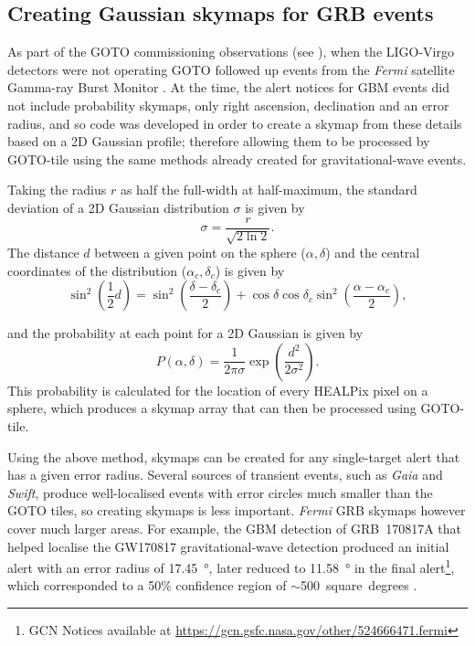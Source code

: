 \subsection{Creating Gaussian skymaps for GRB events}
\label{sec:grb_skymaps}
\begin{colsection}

As part of the GOTO commissioning observations (see ), when the LIGO-Virgo detectors were not operating GOTO followed up  events from the \textit{Fermi} satellite Gamma-ray Burst Monitor \citep[GBM;][]{Fermi_GBM}. At the time, the alert notices for GBM events did not include probability skymaps, only right ascension, declination and an error radius, and so code was developed in order to create a skymap from these details based on a 2D Gaussian profile; therefore allowing them to be processed by GOTO-tile using the same methods already created for gravitational-wave events.

Taking the radius $r$ as half the full-width at half-maximum, the standard deviation of a 2D Gaussian distribution $\sigma$ is given by
%
\begin{equation}
    \sigma = \frac{r}{\sqrt{2 \ln 2}}.
    \label{eq:gaussian_sigma}
\end{equation}
%
The distance $d$ between a given point on the sphere ($\alpha, \delta$) and the central coordinates of the distribution ($\alpha_c, \delta_c$) is given by
%
\begin{equation}
    \sin^2 \left ( \frac{1}{2} d \right )
    = \sin^2 \left ( \frac{\delta-\delta_c}{2} \right)
      + \cos \delta \cos \delta_c \sin^2 \left ( \frac{\alpha-\alpha_c}{2} \right),
    \label{eq:gaussian_distance}
\end{equation}

\noindent and the probability at each point for a 2D Gaussian is given by
%
\begin{equation}
    P(\alpha, \delta) = \frac{1}{2\pi\sigma} \exp \left ( \frac{d^2}{2\sigma^2} \right ).
    \label{eq:gaussian_prob}
\end{equation}
%
This probability is calculated for the location of every HEALPix pixel on a sphere, which produces a skymap array that can then be processed using GOTO-tile.

Using the above method, skymaps can be created for any single-target alert that has a given error radius. Several sources of transient events, such as \textit{Gaia} and \textit{Swift}, produce well-localised events with error circles much smaller than the GOTO tiles, so creating skymaps is less important. \textit{Fermi} GRB skymaps however cover much larger areas. For example, the GBM detection of GRB~170817A that helped localise the GW170817 gravitational-wave detection produced an initial alert with an error radius of \SI{17.45}{\degree}, later reduced to \SI{11.58}{\degree} in the final alert\footnote{GCN Notices available at \url{https://gcn.gsfc.nasa.gov/other/524666471.fermi}}, which corresponded to a 50\% confidence region of $\sim$500~square~degrees \citep{GW170817_Fermi}.


\end{colsection}
